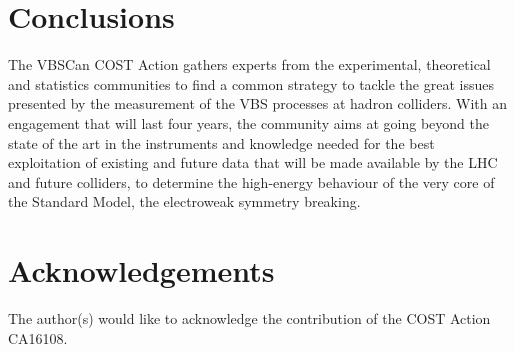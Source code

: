 \documentclass[12pt]{article}
\begin{document}


\section*{Conclusions}

The VBSCan COST Action
gathers experts from the experimental, theoretical and statistics communities
to find a common strategy to tackle the great issues presented
by the measurement of the VBS processes at hadron colliders.
With an engagement that will last four years,
the community aims at going beyond the state of the art
in the instruments and knowledge needed for the best exploitation
of existing and future data 
that will be made available by the LHC and future colliders,
to determine the high-energy behaviour of the very core of the Standard Model,
the electroweak symmetry breaking.

\section*{Acknowledgements}

The author(s) would like to acknowledge the contribution of the COST Action CA16108.

%
% 

\printbibliography
\end{document}
